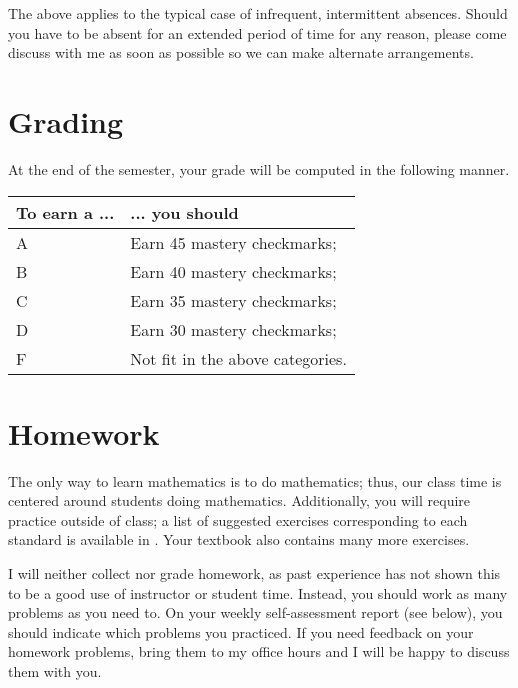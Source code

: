 \documentclass{article}
\begin{document}
The above applies to the typical case of infrequent, intermittent absences. Should you have to be absent for an extended period of time for any reason, please come discuss with me as soon as possible so we can make alternate arrangements.

\noindent \begin{minipage}{\textwidth}
\section*{\fontsize{12}{15}\selectfont Grading}
At the end of the semester, your grade will be computed in the following manner.  \\

\begin{center}
 \begin{tabular}{l|l} 
To earn a  ... & ... you should \\
\hline
A & Earn 45 mastery checkmarks;  \\
\hline

B &  Earn 40 mastery checkmarks; \\
\hline

C 	&Earn 35 mastery checkmarks;\\
\hline

D & Earn 30 mastery checkmarks;\\
\hline

F 	& Not fit in the above categories. \\
\hline
\end{tabular}
\end{center}
\end{minipage}


\section*{\fontsize{12}{15}\selectfont Homework}
The only way to learn mathematics is to do mathematics; thus, our class time is centered around students doing mathematics.  Additionally, you will require practice outside of class; a list of suggested exercises corresponding to each standard is available in \LMS.  Your textbook also contains many more exercises.

I will neither collect nor grade homework, as past experience has not shown this to be a good use of instructor or student time.  Instead, you should work as many problems as you need to.  On your weekly self-assessment report (see below), you should indicate which problems you practiced. If you need feedback on your homework problems, bring them to my office hours and I will be happy to discuss them with you.
\end{document}

